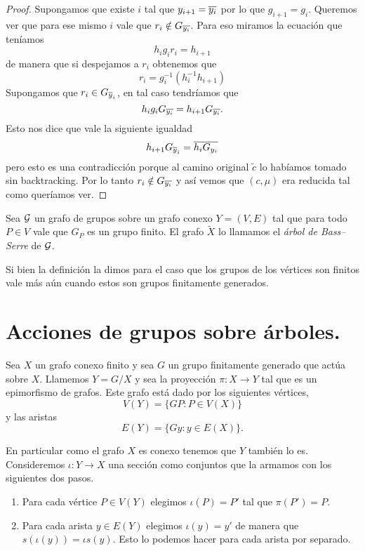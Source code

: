 \documentclass[tesis.tex]{subfiles}
\begin{document}
\begin{proof}
	Supongamos que existe $i$ tal que $y_{i+1} = \overline{y_i}$ por lo que $g_{i+1} = g_{i}$.
	Queremos ver que para ese mismo $i$ vale que $r_i \notin G_{\overline{y_{i}}}$.
	Para eso miramos la ecuación que teníamos 
	\[
		h_ig_ir_i = h_{i+1}
	\]
	de manera que si despejamos a $r_{i}$ obtenemos que
	\[
		r_i =   g_i^{-1}(h_i^{-1} h_{i+1} )
	\]
	Supongamos que $r_{i} \in G_{\overline y_{i}}$, en tal caso tendríamos que 
	\[
		h_ig_i G_{\overline{y_i}} = h_{i+1}G_{\overline{y_i}}.
	\] 
	Esto nos dice que vale la siguiente igualdad 
	\[
	h_{i+1}G_{\overline y_{i}} = \overline{h_{i}G_{y_i}}
	\]
	pero esto es una contradicción porque al camino original $\tilde c$ lo habíamos tomado sin backtracking. 
	Por lo tanto $r_{i} \notin G_{\overline{y_{i}}}$ y así vemos que $(c, \mu)$ era reducida tal como queríamos ver.
	
\end{proof}



\begin{deff}
	Sea ${\cal G}$ un grafo de grupos sobre un grafo conexo $Y=(V,E)$ tal que para todo $P \in V$ vale que $G_{P}$ es un grupo finito.	
	El grafo $\tilde X$ lo llamamos el \emph{árbol de Bass--Serre} de ${\cal G}$.
\end{deff}

Si bien la definición la dimos para el caso que los grupos de los vértices son finitos vale más aún cuando estos son grupos finitamente generados.

\begin{center}
\end{center}
	
\section{Acciones de grupos sobre árboles.}\label{secc_acciones_arboles}

Sea $X$ un grafo conexo finito y sea $G$ un grupo finitamente generado que actúa sobre $X$.
Llamemos $Y = G / X$ y sea la proyección $\pi: X \to Y$ tal que es un epimorfismo de grafos.
Este grafo está dado por los siguientes vértices,
\[
	V(Y) = \{ G P :  P \in V(X)    \}
\]
y las  aristas 
\[
	E(Y) = \{  Gy  : y \in E(X)  \}.
\]

En particular como el grafo $X$ es conexo tenemos que $Y$ también lo es.
Consideremos $\iota: Y \to X$ una sección como conjuntos que la armamos con los siguientes dos pasos.
\begin{enumerate}
	\item Para cada vértice $P \in V(Y)$ elegimos $\iota (P) = P'$ tal que $\pi(P') = P$.
	\item Para cada arista $y \in E(Y)$ elegimos $\iota(y) = y'$ de manera que $s(\iota(y)) = \iota s(y)$. 
	Esto lo podemos hacer para cada arista por separado.
\end{enumerate}
\end{document}
